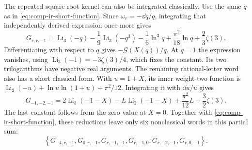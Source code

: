 The repeated square-root kernel can also be integrated classically.
Use the same $q$ as in \eqref{eq:comp-ir-short-function}. Since
$\omega_r=-\dd q/q$, integrating that independently derived expression
once more gives
\begin{equation}
 G_{r,r,-1}=\operatorname{Li}_3(-q)
 -\frac19\operatorname{Li}_3(-q^3)-\frac16\ln^3q
 +\frac{\pi^2}{18}\ln q+\frac23\zeta(3).
\end{equation}
Differentiating with respect to $q$ gives
$-\mathcal G(X(q))/q$. At $q=1$ the expression vanishes, using
$\operatorname{Li}_3(-1)=-3\zeta(3)/4$, which fixes the constant.
Its two trilogarithms have negative real arguments.
The remaining rational-letter word also has a short classical form.
With $u=1+X$, its inner weight-two function is
$\operatorname{Li}_2(-u)+\ln u\ln(1+u)+\pi^2/12$.
Integrating it with $\dd u/u$ gives
\begin{equation}
 G_{-1,-2,-1}=2\operatorname{Li}_3(-1-X)
 -L\operatorname{Li}_2(-1-X)+\frac{\pi^2}{12}L
 +\frac32\zeta(3).
\end{equation}
The last constant follows from the zero value at $X=0$.
Together with \eqref{eq:comp-ir-short-function}, these reductions
leave only six nonclassical words in this partial sum:
\begin{equation}
 \left\{G_{-4,r,-1},G_{0,r,-1},G_{r,-1,-1},
 G_{r,-1,0},G_{r,-2,-1},G_{r,0,-1}\right\}.
\end{equation}

